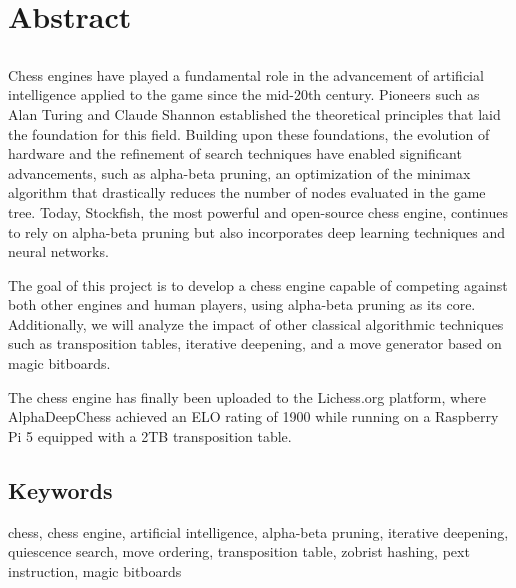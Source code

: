 \chapter*{Abstract}

\section*{\tituloPortadaEngVal}

Chess engines have played a fundamental role in the advancement of artificial intelligence applied to the game since the mid-20th century. Pioneers such as Alan Turing and Claude Shannon established the theoretical principles that laid the foundation for this field. Building upon these foundations, the evolution of hardware and the refinement of search techniques have enabled significant advancements, such as alpha-beta pruning, an optimization of the minimax algorithm that drastically reduces the number of nodes evaluated in the game tree. Today, Stockfish, the most powerful and open-source chess engine, continues to rely on alpha-beta pruning but also incorporates deep learning techniques and neural networks.

\vspace{1em}

The goal of this project is to develop a chess engine capable of competing against both other engines and human players, using alpha-beta pruning as its core. Additionally, we will analyze the impact of other classical algorithmic techniques such as transposition tables, iterative deepening, and a move generator based on magic bitboards.

\vspace{1em}

The chess engine has finally been uploaded to the Lichess.org platform, where AlphaDeepChess achieved an ELO rating of 1900 while running on a Raspberry Pi 5 equipped with a 2TB transposition table.

\section*{Keywords}

\noindent chess, chess engine, artificial intelligence, alpha-beta pruning, iterative deepening, quiescence search, move ordering, transposition table, zobrist hashing, pext instruction, magic bitboards
